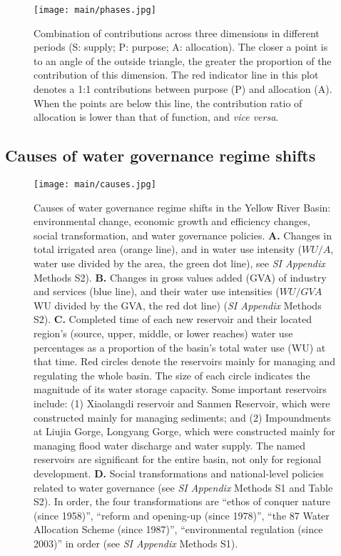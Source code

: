 \begin{figure}[!htbp]
	\centering
	\texttt{[image: main/phases.jpg]}
	\caption{Combination of contributions across three dimensions in different periods (S: supply; P: purpose; A: allocation). The closer a point is to an angle of the outside triangle, the greater the proportion of the contribution of this dimension.
	The red indicator line in this plot denotes a 1:1 contributions between purpose (P) and allocation (A). When the points are below this line, the contribution ratio of allocation is lower than that of function, and \textit{vice versa}.}
	\label{fig:phases}
\end{figure}

\subsection{Causes of water governance regime shifts}
\label{Res.2}

\begin{figure}[th!]
	\centering
	\texttt{[image: main/causes.jpg]}
	\caption{
		Causes of water governance regime shifts in the Yellow River Basin: environmental change, economic growth and efficiency changes, social transformation, and water governance policies.
		\textbf{A.} Changes in total irrigated area (orange line), and in water use intensity ($WU/A$, water use divided by the area, the green dot line), see \textit{SI Appendix} Methods S2).
		\textbf{B.} Changes in gross values added (GVA) of industry and services (blue line), and their water use intensities ($WU/GVA$ WU divided by the GVA, the red dot line) (\textit{SI Appendix} Methods S2).
		\textbf{C.} Completed time of each new reservoir and their located region's (source, upper, middle, or lower reaches) water use percentages as a proportion of the basin's total water use (WU) at that time. Red circles denote the reservoirs mainly for managing and regulating the whole basin.
		The size of each circle indicates the magnitude of its water storage capacity. Some important reservoirs include: (1) Xiaolangdi reservoir and Sanmen Reservoir, which were constructed mainly for managing sediments; and (2) Impoundments at Liujia Gorge, Longyang Gorge, which were constructed mainly for managing flood water discharge and water supply. The named reservoirs are significant for the entire basin, not only for regional development.
		\textbf{D.} Social transformations and national-level policies related to water governance (see \textit{SI Appendix} Methods S1 and Table S2). In order, the four transformations are ``ethos of conquer nature (since 1958)'', ``reform and opening-up (since 1978)'', ``the 87 Water Allocation Scheme (since 1987)'', ``environmental regulation (since 2003)'' in order (see \textit{SI Appendix} Methods S1).
	}
	\label{fig:Causes}
\end{figure}

